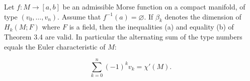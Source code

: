 Let $f: M \rightarrow [a,b]$ be an admissible Morse function on a compact manifold, of type $(v_0, \ldots, v_n)$. Assume that $f^{-1}(a) = \varnothing$. If $\beta_k$ denotes the dimension of $H_k(M; F)$ where $F$ is a field, then the inequalities (a) and equality (b) of Theorem 3.4 are valid. In particular the alternating sum of the type numbers equals the Euler characteristic of $M$:

$$\sum_{k=0}^{n} (-1)^k v_k = \chi'(M).$$
